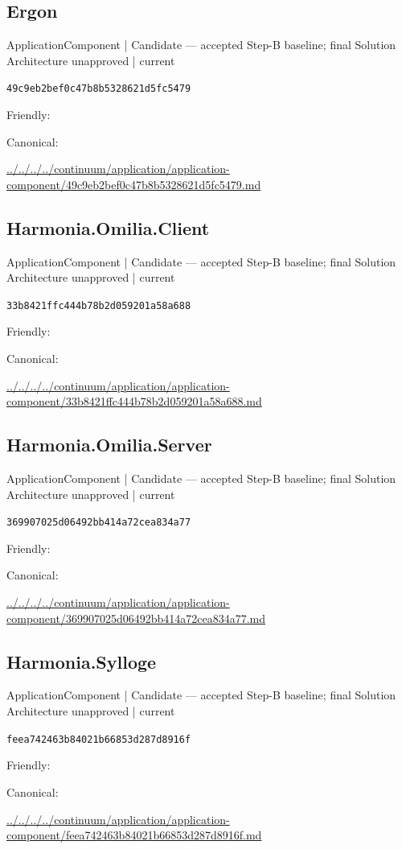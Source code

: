 \documentclass[10pt,a4paper]{article}
\begin{document}
\subsection*{Ergon}
{\small ApplicationComponent | Candidate — accepted Step-B baseline; final Solution Architecture unapproved | current}\par
\texttt{49c9eb2bef0c47b8b5328621d5fc5479}\par
Friendly: \par
Canonical: \par
{\footnotesize\url{../../../../continuum/application/application-component/49c9eb2bef0c47b8b5328621d5fc5479.md}}\par
\subsection*{Harmonia.Omilia.Client}
{\small ApplicationComponent | Candidate — accepted Step-B baseline; final Solution Architecture unapproved | current}\par
\texttt{33b8421ffc444b78b2d059201a58a688}\par
Friendly: \par
Canonical: \par
{\footnotesize\url{../../../../continuum/application/application-component/33b8421ffc444b78b2d059201a58a688.md}}\par
\subsection*{Harmonia.Omilia.Server}
{\small ApplicationComponent | Candidate — accepted Step-B baseline; final Solution Architecture unapproved | current}\par
\texttt{369907025d06492bb414a72cea834a77}\par
Friendly: \par
Canonical: \par
{\footnotesize\url{../../../../continuum/application/application-component/369907025d06492bb414a72cea834a77.md}}\par
\subsection*{Harmonia.Sylloge}
{\small ApplicationComponent | Candidate — accepted Step-B baseline; final Solution Architecture unapproved | current}\par
\texttt{feea742463b84021b66853d287d8916f}\par
Friendly: \par
Canonical: \par
{\footnotesize\url{../../../../continuum/application/application-component/feea742463b84021b66853d287d8916f.md}}\par
\end{document}
